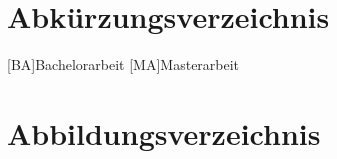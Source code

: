 \documentclass[12pt,a4paper,bibliography=totoc,listof=totoc]{scrartcl}
\begin{document}
\section{Abkürzungsverzeichnis}
\begin{acronym}[KDE]
	[BA]{Bachelorarbeit}
	[MA]{Masterarbeit}
\end{acronym}
\pagebreak


\section {Abbildungsverzeichnis}
\listoffigures
\pagebreak




\renewcommand\refname{Literaturverzeichnis}
\lhead{}
%


\pagebreak
\end{document}
